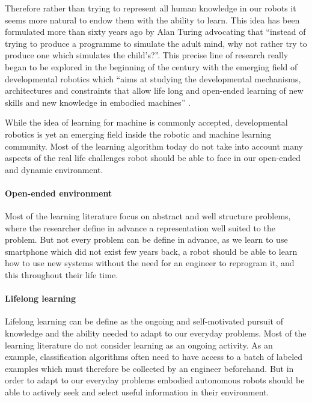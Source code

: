 Therefore rather than trying to represent all human knowledge in our robots it seems more natural to endow them with the ability to learn. This idea has been formulated more than sixty years ago by Alan Turing \cite{turing1950computing} advocating that ``instead of trying to produce a programme to simulate the adult mind, why not rather try to produce one which simulates the child's?''. 
This precise line of research really began to be explored in the beginning of the century with the emerging field of developmental robotics \cite{weng2001autonomous,lungarella2003developmental} which ``aims at studying the developmental mechanisms, architectures and constraints that allow life long and open-ended learning of new skills and new knowledge in embodied machines'' \cite{oudeyer2012developmental}. 

While the idea of learning for machine is commonly accepted, developmental robotics is yet an emerging field inside the robotic and machine learning community. Most of the learning algorithm today do not take into account many aspects of the real life challenges robot should be able to face in our open-ended and dynamic environment. 

\paragraph{Open-ended environment} Most of the learning literature focus on abstract and well structure problems, where the researcher define in advance a representation well suited to the problem. But not every problem can be define in advance, as we learn to use smartphone which did not exist few years back, a robot should be able to learn how to use new systems without the need for an engineer to reprogram it, and this throughout their life time.

\paragraph{Lifelong learning} Lifelong learning can be define as the ongoing and self-motivated pursuit of knowledge and the ability needed to adapt to our everyday problems. Most of the learning literature do not consider learning as an ongoing activity. As an example, classification algorithms often need to have access to a batch of labeled examples which must therefore be collected by an engineer beforehand. But in order to adapt to our everyday problems embodied autonomous robots should be able to actively seek and select useful information in their environment. 

